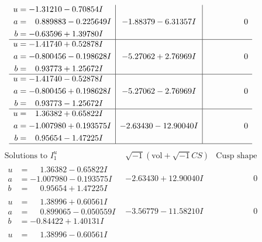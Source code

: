 \documentclass[1p]{elsarticle_modified}
\theoremstyle{definition}
\newcommand{\I}{\sqrt{-1}}
\begin{document}
$$\begin{array}{c|c|c}
\begin{aligned}
u &= -1.31210 - 0.70854 I \\
a &= \phantom{-}0.889883 - 0.225649 I \\
b &= -0.63596 + 1.39780 I\end{aligned}
 & -1.88379 - 6.31357 I & \phantom{-0.000000 } 0 \\ \hline\begin{aligned}
u &= -1.41740 + 0.52878 I \\
a &= -0.800456 - 0.198628 I \\
b &= \phantom{-}0.93773 + 1.25672 I\end{aligned}
 & -5.27062 + 2.76969 I & \phantom{-0.000000 } 0 \\ \hline\begin{aligned}
u &= -1.41740 - 0.52878 I \\
a &= -0.800456 + 0.198628 I \\
b &= \phantom{-}0.93773 - 1.25672 I\end{aligned}
 & -5.27062 - 2.76969 I & \phantom{-0.000000 } 0 \\ \hline\begin{aligned}
u &= \phantom{-}1.36382 + 0.65822 I \\
a &= -1.007980 + 0.193575 I \\
b &= \phantom{-}0.95654 - 1.47225 I\end{aligned}
 & -2.63430 - 12.90040 I & \phantom{-0.000000 } 0\\
 \hline 
 \end{array}$$\newpage$$\begin{array}{c|c|c}  
\text{Solutions to }I^u_{1}& \I (\text{vol} + \sqrt{-1}CS) & \text{Cusp shape}\\
 \hline 
\begin{aligned}
u &= \phantom{-}1.36382 - 0.65822 I \\
a &= -1.007980 - 0.193575 I \\
b &= \phantom{-}0.95654 + 1.47225 I\end{aligned}
 & -2.63430 + 12.90040 I & \phantom{-0.000000 } 0 \\ \hline\begin{aligned}
u &= \phantom{-}1.38996 + 0.60561 I \\
a &= \phantom{-}0.899065 - 0.050559 I \\
b &= -0.84422 + 1.40131 I\end{aligned}
 & -3.56779 - 11.58210 I & \phantom{-0.000000 } 0 \\ \hline\begin{aligned}
u &= \phantom{-}1.38996 - 0.60561 I \\

\end{aligned}
\end{array}$$
\end{document}
